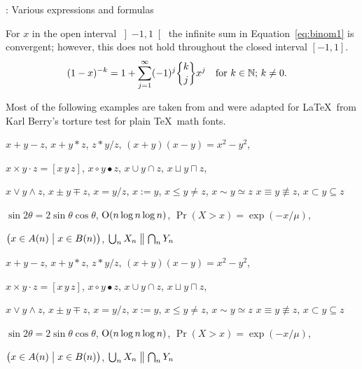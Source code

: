 \documentclass[aspectratio = 169, t, 10pt]{beamer}
\newcommand{\nequiv}{\not\equiv}
\begin{document}
\begin{frame}[allowframebreaks]{\insertsection: Various expressions and formulas}
\framebreak

For $x$ in the open interval \( \left] -1, 1 \right[ \)
the infinite sum in Equation~\eqref{eq:binom1} is convergent;
however, this does not hold
throughout the closed interval \( \left[ -1, 1 \right] \).
\begin{align}
  (1 - x)^{-k} &=
    1 + \sum_{j=1}^{\infty} (-1)^j \ibinom{k}{j} x^j
    \text{\quad for $k \in \mathbb{N}$; $k \neq 0$.}
    \label{eq:binom1}
\end{align}

\framebreak

Most of the following examples are taken from  \citep[][see \url{https://ctan.org/pkg/texbook}]{knuth:ct:a} and were adapted for \LaTeX\ from Karl Berry's torture test for plain \TeX\ math fonts.

\framebreak

\noindent $x + y - z$, \quad $x + y * z$, \quad $z * y / z$, \quad
$(x+y)(x-y) = x^2 - y^2$,

\noindent $x \times y \cdot z = [x\, y\, z]$, \quad $x\circ y \bullet z$, \quad
$x\cup y \cap z$, \quad $x\sqcup y \sqcap z$, \quad

\noindent $x \vee y \wedge z$, \quad $x\pm y\mp z$, \quad
$x=y/z$, \;\; $x:=y$, \;\; $x\le y \ne z$, \;\; $x \sim y \simeq z$
$x \equiv y \nequiv z$, \;\; $x\subset y \subseteq z$

\noindent $\sin2\theta=2\sin\theta\cos\theta$, \quad
$\hbox{O}(n\log n\log n)$, \quad
$\Pr(X>x)=\exp(-x/\mu)$,

\noindent $\bigl(x\in A(n)\bigm|x\in B(n)\bigr)$, \quad
$\bigcup_n X_n\bigm\|\bigcap_n Y_n$

\bigskip

\begingroup

\bfseries\boldmath

\noindent $x + y - z$, \quad $x + y * z$, \quad $z * y / z$, \quad
$(x+y)(x-y) = x^2 - y^2$,

\noindent $x \times y \cdot z = [x\, y\, z]$, \quad $x\circ y \bullet z$, \quad
$x\cup y \cap z$, \quad $x\sqcup y \sqcap z$, \quad

\noindent $x \vee y \wedge z$, \quad $x\pm y\mp z$, \quad
$x=y/z$, \;\; $x:=y$, \;\; $x\le y \ne z$, \;\; $x \sim y \simeq z$
$x \equiv y \nequiv z$, \;\; $x\subset y \subseteq z$

\noindent $\sin2\theta=2\sin\theta\cos\theta$, \quad
$\hbox{O}(n\log n\log n)$, \quad
$\Pr(X>x)=\exp(-x/\mu)$,

\noindent $\bigl(x\in A(n)\bigm|x\in B(n)\bigr)$, \quad
$\bigcup_n X_n\bigm\|\bigcap_n Y_n$


\end{frame}
\end{document}
